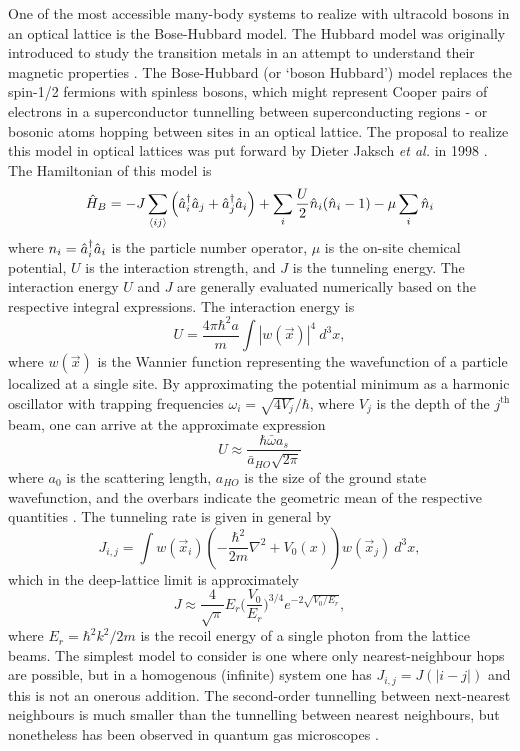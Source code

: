 	One of the most accessible many-body systems to realize with ultracold bosons in an optical lattice is the Bose-Hubbard model.
	The Hubbard model was originally introduced to study the transition metals in an attempt to understand their magnetic properties \cite{SachdevQPT}.
	The Bose-Hubbard (or `boson Hubbard') model replaces the spin-1/2 fermions with spinless bosons, which might represent Cooper pairs of electrons in a superconductor tunnelling between superconducting regions - or bosonic atoms hopping between sites in an optical lattice.
	The proposal to realize this model in optical lattices was put forward by Dieter Jaksch \emph{et al.} in 1998 \cite{Jaksch98}.
	The Hamiltonian of this model is 
	\begin{equation}
		\hat{H}_B = -J\sum_{\langle i j\rangle}\left(\hat{a}^\dagger_i\hat{a}_j+\hat{a}^\dagger_j\hat{a}_i\right) 
		+	\sum_{i} \frac{U}{2}\hat{n}_{i}(\hat{n}_{i}-1) 
		- \mu\sum_{i} \hat{n}_i
		\label{eqn:BH_ham}
	\end{equation}
	where $n_i = \hat{a}^\dagger_i\hat{a}_i$ is the particle number operator, $\mu$ is the on-site chemical potential, $U$ is the interaction strength, and $J$ is the tunneling energy.
	The interaction energy $U$ and $J$ are generally evaluated numerically  based on the respective integral expressions.
	The interaction energy is
	\begin{equation}
		U = \frac{4\pi\hbar^2 a}{m}\int |w(\vec{x})|^4~d^3 x,
	\end{equation}
	where $w(\vec{x})$ is the Wannier function \cite{Wannier37,Marzari00} representing the wavefunction of a particle localized at a single site.
	By approximating the potential minimum as a harmonic oscillator with trapping frequencies $\omega_i = \sqrt{4 V_j}/\hbar$, where $V_j$ is the depth of the $j^{\textrm{th}}$ beam, one can arrive at the approximate expression 
	\begin{equation}
		U \approx \frac{\hbar \bar{\omega}a_s}{\bar{a}_{HO}\sqrt{2\pi}}
	\end{equation}
	where $a_0$ is the scattering length, $a_{HO}$ is the size of the ground state wavefunction, and the overbars indicate the geometric mean of the respective quantities	\cite{Jaksch98}.
	The tunneling rate is given in general by
	\begin{equation}
		J_{i,j} = \int w(\vec{x}_i) \left(-\frac{\hbar^2}{2m}\nabla^2 + V_0(x)\right)w(\vec{x}_j)~d^3 x,
	\end{equation}
	which in the deep-lattice limit is approximately \cite{Jaksch98}
	\begin{equation}
		J \approx \frac{4}{\sqrt{\pi}} E_r\Big(\frac{V_0}{E_r}\Big)^{3/4}e^{-2\sqrt{V_0/E_r}},
	\end{equation}
	where $E_r = \hbar^2k^2/2m$ is the recoil energy of a single photon from the lattice beams.
	The simplest model to consider is one where only nearest-neighbour hops are possible, but in a homogenous (infinite) system one has $J_{i,j} = J(|i-j|)$ and this is not an onerous addition.
	The second-order tunnelling between next-nearest neighbours is much smaller than the tunnelling between nearest neighbours, but nonetheless has been observed in quantum gas microscopes \cite{Folling07}.
	
